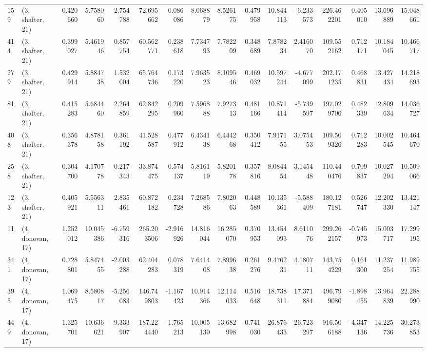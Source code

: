 \begin{tabular}{llrrrrrrrrrrrrrr}
159 &  (3, shafter, 21) &   0.420660 &   5.758060 &   2.754788 &    72.695662 &   0.086086 &   8.068879 &   8.526175 &  0.479958 &  10.844113 &  -6.233573 &   226.462201 &  0.405010 &  13.696889 &  15.048661 \\
414 &  (3, shafter, 21) &   0.399027 &   5.461946 &   0.857754 &    60.562771 &   0.238618 &   7.734793 &   7.782209 &  0.348689 &   7.878234 &   2.416070 &   109.552162 &  0.712171 &  10.184045 &  10.466717 \\
279 &  (3, shafter, 21) &   0.429914 &   5.884738 &   1.532004 &    65.764736 &   0.173220 &   7.963523 &   8.109546 &  0.469032 &  10.597244 &  -4.677099 &   202.171235 &  0.468831 &  13.427434 &  14.218693 \\
81  &  (3, shafter, 21) &   0.415283 &   5.684460 &   2.264859 &    62.842295 &   0.209960 &   7.596888 &   7.927313 &  0.481166 &  10.871414 &  -5.739597 &   197.029706 &  0.482339 &  12.809634 &  14.036727 \\
408 &  (3, shafter, 21) &   0.356378 &   4.878158 &   0.361192 &    41.528587 &   0.477912 &   6.434138 &   6.444268 &  0.350412 &   7.917155 &   3.075453 &   109.509326 &  0.712283 &  10.002545 &  10.464670 \\
258 &  (3, shafter, 21) &   0.304700 &   4.170778 &  -0.217343 &    33.874475 &   0.574137 &   5.816119 &   5.820178 &  0.357816 &   8.084454 &   3.145448 &   110.440476 &  0.709837 &  10.027294 &  10.509066 \\
123 &  (3, shafter, 21) &   0.405921 &   5.556311 &   2.835461 &    60.872182 &   0.234728 &   7.268586 &   7.802063 &  0.448589 &  10.135361 &  -5.588409 &   180.127181 &  0.526747 &  12.202330 &  13.421147 \\
11  &  (4, donovan, 17) &   1.252012 &  10.045386 &  -6.759316 &   265.203506 &  -2.916926 &  14.816044 &  16.285070 &  0.370953 &  13.454093 &   8.611076 &   299.262157 & -0.745973 &  15.003717 &  17.299195 \\
341 &  (4, donovan, 17) &   0.728801 &   5.847455 &  -2.003288 &    62.404283 &   0.078319 &   7.641408 &   7.899638 &  0.261276 &   9.476231 &   4.180711 &   143.754229 &  0.161300 &  11.237254 &  11.989755 \\
395 &  (4, donovan, 17) &   1.069475 &   8.580817 &  -5.256083 &   146.749803 &  -1.167423 &  10.914366 &  12.114033 &  0.516648 &  18.738311 &  17.371884 &   496.799080 & -1.898455 &  13.964839 &  22.288990 \\
449 &  (4, donovan, 17) &   1.325701 &  10.636621 &  -9.333907 &   187.224440 &  -1.765213 &  10.005130 &  13.682998 &  0.741030 &  26.876433 &  26.723297 &   916.506188 & -4.347136 &  14.225736 &  30.273853 \\

\end{tabular}
